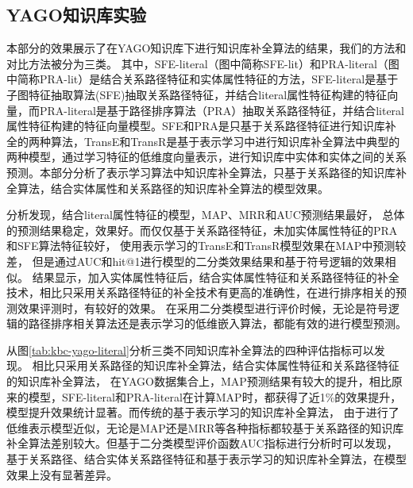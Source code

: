 \subsection{YAGO知识库实验}
\label{cha:exp-literal}
本部分的效果展示了在YAGO知识库下进行知识库补全算法的结果，我们的方法和对比方法被分为三类。
其中，SFE-literal（图中简称SFE-lit）和PRA-literal（图中简称PRA-lit）是结合关系路径特征和实体属性特征的方法，SFE-literal是基于子图特征抽取算法(SFE)抽取关系路径特征，并结合literal属性特征构建的特征向量，而PRA-literal是基于路径排序算法（PRA）抽取关系路径特征，并结合literal属性特征构建的特征向量模型。SFE和PRA是只基于关系路径特征进行知识库补全的两种算法，TransE和TransR是基于表示学习中进行知识库补全算法中典型的两种模型，通过学习特征的低维度向量表示，进行知识库中实体和实体之间的关系预测。本部分分析了表示学习算法中知识库补全算法，只基于关系路径的知识库补全算法，结合实体属性和关系路径的知识库补全算法的模型效果。

分析发现，结合literal属性特征的模型，MAP、MRR和AUC预测结果最好，
总体的预测结果稳定，效果好。而仅仅基于关系路径特征，未加实体属性特征的PRA和SFE算法特征较好，
使用表示学习的TransE和TransR模型效果在MAP中预测较差，
但是通过AUC和hit@1进行模型的二分类效果结果和基于符号逻辑的效果相似。
结果显示，加入实体属性特征后，结合实体属性特征和关系路径特征的补全技术，相比只采用关系路径特征的补全技术有更高的准确性，在进行排序相关的预测效果评测时，有较好的效果。
在采用二分类模型进行评价时候，无论是符号逻辑的路径排序相关算法还是表示学习的低维嵌入算法，都能有效的进行模型预测。

从图\ref{tab:kbc-yago-literal}分析三类不同知识库补全算法的四种评估指标可以发现。
相比只采用关系路径的知识库补全算法，结合实体属性特征和关系路径特征的知识库补全算法，
在YAGO数据集合上，MAP预测结果有较大的提升，相比原来的模型，SFE-literal和PRA-literal在计算MAP时，都获得了近1\%的效果提升，模型提升效果统计显著。而传统的基于表示学习的知识库补全算法，
由于进行了低维表示模型近似，无论是MAP还是MRR等各种指标都较基于关系路径的知识库补全算法差别较大。但基于二分类模型评价函数AUC指标进行分析时可以发现，基于关系路径、结合实体关系路径特征和基于表示学习的知识库补全算法，在模型效果上没有显著差异。

